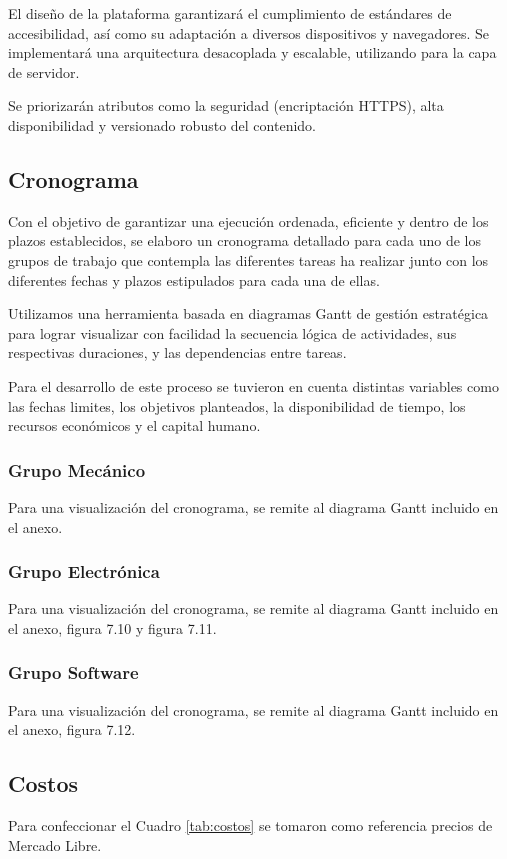     El diseño de la plataforma garantizará el cumplimiento de estándares de accesibilidad, así como
    su adaptación a diversos dispositivos y navegadores. Se implementará una arquitectura desacoplada
    y escalable, utilizando para la capa de servidor.

    Se priorizarán atributos como la seguridad (encriptación HTTPS), alta disponibilidad y versionado
    robusto del contenido.


  \subsection{Cronograma}
    Con el objetivo de garantizar una ejecución ordenada, eficiente y dentro de los plazos
    establecidos, se elaboro un cronograma detallado para cada uno de los grupos de trabajo que
    contempla las diferentes tareas ha realizar junto con los diferentes fechas y plazos estipulados
    para cada una de ellas.

    Utilizamos una herramienta basada en diagramas Gantt de gestión estratégica para lograr
    visualizar con facilidad la secuencia lógica de actividades, sus respectivas duraciones, y las
    dependencias entre tareas.

    Para el desarrollo de este proceso se tuvieron en cuenta distintas variables como las fechas
    limites, los objetivos planteados, la disponibilidad de tiempo, los recursos económicos y el
    capital humano.

    \subsubsection{Grupo Mecánico}
    Para una visualización del cronograma, se remite al diagrama Gantt incluido en el anexo.
    \subsubsection{Grupo Electrónica}
    Para una visualización del cronograma, se remite al diagrama Gantt incluido en el anexo,
    figura 7.10 y figura 7.11.
    \subsubsection{Grupo Software}
    Para una visualización del cronograma, se remite al diagrama Gantt incluido en el anexo,
    figura 7.12.

  \subsection{Costos}
    Para confeccionar el Cuadro \ref{tab:costos} se tomaron como referencia precios de
    Mercado Libre.


